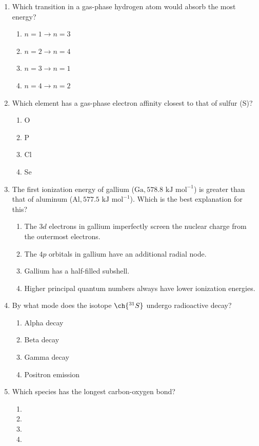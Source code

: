 \documentclass[twocolumn,10pt]{article}
\begin{document}
\begin{enumerate}[label=\arabic*., leftmargin=*]
\item Which transition in a gas-phase hydrogen atom would absorb the most energy?
\begin{enumerate}[label=(\Alph*)]
    \item $n=1 \rightarrow n=3$ \item $n=2 \rightarrow n=4$ \item $n=3 \rightarrow n=1$ \item $n=4 \rightarrow n=2$
\end{enumerate}

\item Which element has a gas-phase electron affinity closest to that of sulfur (S)?
\begin{enumerate}[label=(\Alph*)]
    \item O \item P \item Cl \item Se
\end{enumerate}

\item The first ionization energy of gallium ($\text{Ga}, 578.8\text{ kJ mol}^{-1}$) is greater than that of aluminum ($\text{Al}, 577.5\text{ kJ mol}^{-1}$). Which is the best explanation for this?
\begin{enumerate}[label=(\Alph*)]
    \item The $3d$ electrons in gallium imperfectly screen the nuclear charge from the outermost electrons.
    \item The $4p$ orbitals in gallium have an additional radial node.
    \item Gallium has a half-filled subshell.
    \item Higher principal quantum numbers always have lower ionization energies.
\end{enumerate}

\item By what mode does the isotope $\ch{^{31}S}$ undergo radioactive decay?
\begin{enumerate}[label=(\Alph*)]
    \item Alpha decay \item Beta decay \item Gamma decay \item Positron emission
\end{enumerate}

\item Which species has the longest carbon-oxygen bond?
\begin{enumerate}[label=(\Alph*)]
    \item {} \item {} \item {} \item {}
\end{enumerate}


\end{enumerate}
\end{document}

